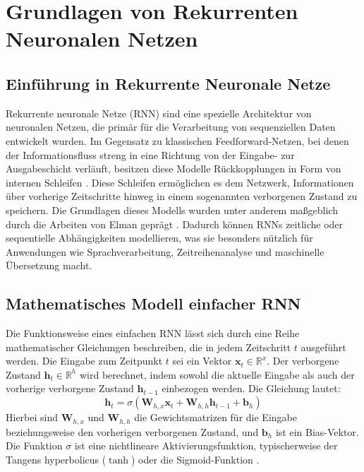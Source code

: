 \chapter{Grundlagen von Rekurrenten Neuronalen Netzen}

\section{Einführung in Rekurrente Neuronale Netze}
Rekurrente neuronale Netze (\acs{RNN}) sind eine spezielle Architektur von neuronalen Netzen, die primär für die Verarbeitung von sequenziellen Daten entwickelt wurden. Im Gegensatz zu klassischen Feedforward-Netzen, bei denen der Informationsfluss streng in eine Richtung von der Eingabe- zur Ausgabeschicht verläuft, besitzen diese Modelle Rückkopplungen in Form von internen Schleifen \autocite{d2l}. Diese Schleifen ermöglichen es dem Netzwerk, Informationen über vorherige Zeitschritte hinweg in einem sogenannten verborgenen Zustand zu speichern. Die Grundlagen dieses Modells wurden unter anderem maßgeblich durch die Arbeiten von Elman geprägt \autocite{Elman1990}. Dadurch können \acp{RNN} zeitliche oder sequentielle Abhängigkeiten modellieren, was sie besonders nützlich für Anwendungen wie Sprachverarbeitung, Zeitreihenanalyse und maschinelle Übersetzung macht.

\section[Mathematisches Modell einfacher RNN]{Mathematisches Modell einfacher \texorpdfstring{\acs{RNN}}{RNN}}
Die Funktionsweise eines einfachen \acs{RNN} lässt sich durch eine Reihe mathematischer Gleichungen beschreiben, die in jedem Zeitschritt $t$ ausgeführt werden. Die Eingabe zum Zeitpunkt $t$ sei ein Vektor $\mathbf{x}_t \in \mathbb{R}^x$. Der verborgene Zustand $\mathbf{h}_t \in \mathbb{R}^h$ wird berechnet, indem sowohl die aktuelle Eingabe als auch der vorherige verborgene Zustand $\mathbf{h}_{t-1}$ einbezogen werden. Die Gleichung lautet:
\begin{equation}
\mathbf{h}_t = \sigma(\mathbf{W}_{h,x} \mathbf{x}_t + \mathbf{W}_{h,h} \mathbf{h}_{t-1} + \mathbf{b}_h)
\end{equation}
Hierbei sind $\mathbf{W}_{h,x}$ und $\mathbf{W}_{h,h}$ die Gewichtsmatrizen für die Eingabe beziehungsweise den vorherigen verborgenen Zustand, und $\mathbf{b}_h$ ist ein Bias-Vektor. Die Funktion $\sigma$ ist eine nichtlineare Aktivierungsfunktion, typischerweise der Tangens hyperbolicus ($\tanh$) oder die Sigmoid-Funktion \autocite{d2l}.

